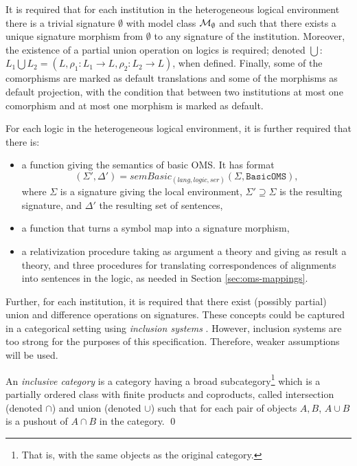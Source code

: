 \documentclass[10pt,fleqn,final]{scrreprt}
\newcommand*{\syntax}[1]{\texttt{#1}}
\newenvironment{definitions}[0]{\medskip }{}
\begin{document}
\begin{definitions}
 It is required that for each institution in the heterogeneous logical environment there is a trivial signature
$\emptyset$ with model class ${\cal M}_\emptyset$ and such that there exists a unique signature morphism
from $\emptyset$ to any signature of the institution. Moreover, the existence of a partial union operation on logics is required; denoted $\bigcup$: 
$L_1 \bigcup L_2 = (L, \rho_1:L_1 \to L, \rho_2 : L_2 \to L)$, when defined. Finally, some of the comorphisms are marked as default translations and some of the morphisms as default projection, with the condition that between two institutions at most one comorphism 
and at most one morphism is marked as default.

For each logic in the heterogeneous logical environment, it is further required that there is:

\begin{itemize}
  \item  a function giving the semantics of basic OMS. It has format 
$$(\Sigma',\Delta')=\mathit{semBasic}_{(lang,logic,ser)}(\Sigma,\syntax{BasicOMS}),$$ where $\Sigma$ is a
signature giving the local environment,  $\Sigma'\supseteq\Sigma$ is
the resulting signature, and $\Delta'$ the resulting set of sentences,
  \item a function that turns a symbol map into a signature morphism,
  \item a relativization procedure taking as argument a theory and giving as 
  result a theory, and three procedures for translating correspondences of alignments
  into sentences in the logic, as needed in Section \ref{sec:oms-mappings}.
\end{itemize}


Further,  for each institution, it is required that there exist (possibly partial) union and difference operations on signatures.
These concepts could be captured in a categorical setting using \emph{inclusion systems} \cite{DGS91}.
 However, inclusion systems are too strong for the purposes of this specification.  Therefore, weaker assumptions will be used.

\begin{definition}  
 An \emph{inclusive category} \cite{DBLP:conf/birthday/GoguenR04} 
 is a category having a broad subcategory\footnote{That is, with the same objects as the original category.}
which is a partially ordered class with finite products and coproducts, called intersection (denoted $\cap$) and union
(denoted $\cup$) such that for each pair of objects $A, B$, $A \cup B$ is a pushout of $A \cap B$ in the category.
\qed \end{definition}


\end{definitions}
\end{document}
